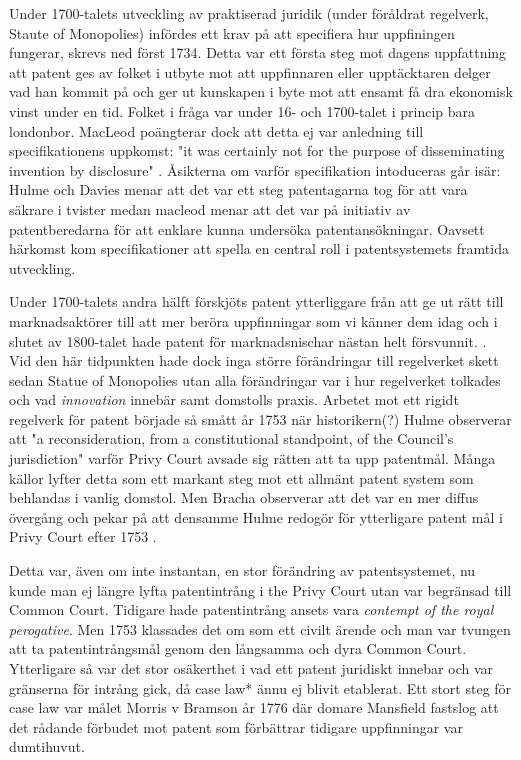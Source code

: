 Under 1700-talets utveckling av praktiserad juridik (under föråldrat regelverk, Staute of Monopolies) infördes ett krav på att specifiera hur uppfiningen fungerar, skrevs ned först 1734. Detta
var ett första steg mot dagens uppfattning att patent ges av folket i utbyte mot att uppfinnaren eller
upptäcktaren delger vad han kommit på och ger ut kunskapen i byte mot att ensamt få dra ekonomisk vinst
under en tid. Folket i fråga var under 16- och 1700-talet i princip bara londonbor. MacLeod poängterar dock att detta ej var anledning till specifikationens uppkomst: "it was certainly not for the purpose of disseminating invention by disclosure" \cite{macleod2}. Åsikterna om varför specifikation intoduceras går isär: Hulme och Davies menar att det var ett steg patentagarna tog för att vara säkrare i tvister medan macleod menar att det var på initiativ av patentberedarna för att enklare kunna undersöka patentansökningar. Oavsett härkomst kom specifikationer att spella en central roll i patentsystemets framtida utveckling.

Under 1700-talets andra hälft förskjöts patent ytterliggare från att ge ut rätt till marknadsaktörer till att mer beröra uppfinningar som vi känner dem idag och i slutet av 1800-talet hade patent för marknadsnischar nästan helt försvunnit. \cite{bracha}. 
Vid den här tidpunkten hade dock inga större förändringar till regelverket skett sedan Statue of Monopolies
utan alla förändringar var i hur regelverket tolkades och vad \emph{innovation} innebär samt domstolls
praxis. Arbetet mot ett rigidt regelverk för patent började så smått år 1753 när historikern(?) Hulme \cite{hulme} observerar att "a reconsideration, from a constitutional standpoint, of the Council’s jurisdiction" varför Privy Court avsade sig rätten att ta upp patentmål. Många källor lyfter detta som ett markant steg mot ett allmänt patent system som behlandas i vanlig domstol. Men Bracha observerar att det var en mer diffus övergång och pekar på att densamme Hulme redogör för ytterligare patent mål i Privy Court efter 1753 \cite{bracha}.

Detta var, även om inte instantan, en stor förändring av patentsystemet, nu kunde man ej längre lyfta patentintrång i the Privy Court utan var begränsad till Common Court. Tidigare hade patentintrång ansets vara \emph{contempt of the royal perogative}. Men 1753 klassades det om som ett civilt ärende och man var tvungen att ta patentintrångsmål genom den långsamma och dyra Common Court. Ytterligare så var det stor osäkerthet i vad ett patent juridiskt innebar och var gränserna för intrång gick, då case law* ännu ej blivit etablerat. Ett stort steg för case law var målet Morris v Bramson år 1776 där domare Mansfield fastslog att det rådande förbudet mot patent som förbättrar tidigare uppfinningar var dumtihuvut\cite{bracha}.

